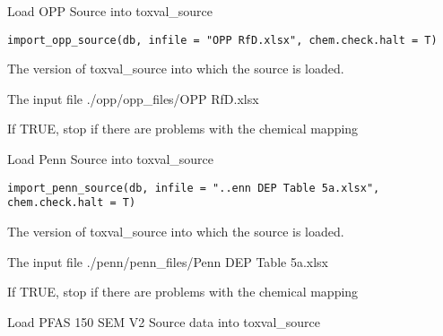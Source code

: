 \documentclass[letterpaper]{book}
\begin{document}
%
\begin{Description}\relax
Load OPP Source into toxval\_source
\end{Description}
%
\begin{Usage}
\begin{verbatim}
import_opp_source(db, infile = "OPP RfD.xlsx", chem.check.halt = T)
\end{verbatim}
\end{Usage}
%
\begin{Arguments}
\begin{ldescription}
\item[\code{db}] The version of toxval\_source into which the source is loaded.

\item[\code{infile}] The input file ./opp/opp\_files/OPP RfD.xlsx

\item[\code{chem.check.halt}] If TRUE, stop if there are problems with the chemical mapping
\end{ldescription}
\end{Arguments}
%
\begin{Description}\relax
Load Penn Source into toxval\_source
\end{Description}
%
\begin{Usage}
\begin{verbatim}
import_penn_source(db, infile = "..enn DEP Table 5a.xlsx", chem.check.halt = T)
\end{verbatim}
\end{Usage}
%
\begin{Arguments}
\begin{ldescription}
\item[\code{db}] The version of toxval\_source into which the source is loaded.

\item[\code{infile}] The input file ./penn/penn\_files/Penn DEP Table 5a.xlsx

\item[\code{chem.check.halt}] If TRUE, stop if there are problems with the chemical mapping
\end{ldescription}
\end{Arguments}
%
\begin{Description}\relax
Load PFAS 150 SEM V2 Source data into toxval\_source
\end{Description}
\end{document}

